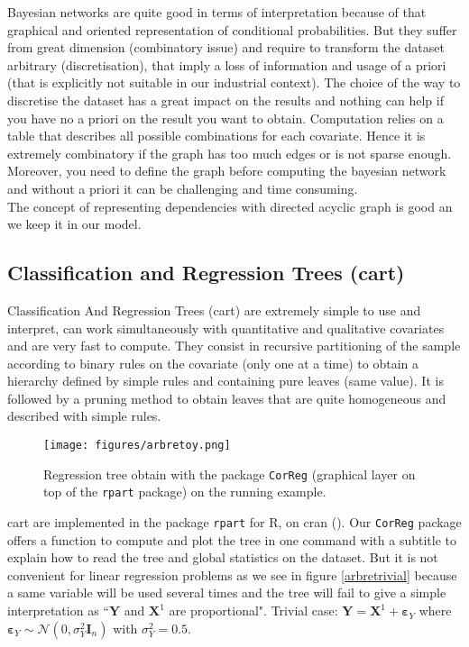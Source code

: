 \documentclass[12pt,a4paper]{report}
\begin{document}
		Bayesian networks are quite good in terms of interpretation because of that graphical and oriented representation of conditional probabilities. But they suffer from great dimension (combinatory issue) and require to transform the dataset arbitrary (discretisation), that imply a loss of information and usage of a priori (that is explicitly not suitable in our industrial context). The choice of the way to discretise the dataset has a great impact on the results and nothing can help if you have no a priori on the result you want to obtain. Computation relies on a table that describes all possible combinations for each covariate. Hence it is extremely combinatory if the graph has too much edges or is not sparse enough. Moreover, you need to define the graph before computing the bayesian network and without a priori it can be challenging and time consuming.\\
		
The concept of representing dependencies with directed acyclic graph is good an we keep it in our model.		
			
	
		
	
\subsection{Classification and Regression Trees ({\sc cart})}

	
		Classification And Regression Trees ({\sc cart}) \cite{breiman1984classification} are extremely simple to use and interpret, can work simultaneously with quantitative and qualitative covariates and are very fast to compute. They consist in recursive partitioning of the sample according to binary rules on the covariate (only one at a time) to obtain a hierarchy defined by simple rules and containing pure leaves (same value). It is followed by a pruning method to obtain leaves that are quite homogeneous and described with simple rules.\\
		
		\begin{figure}
			\centering
				\texttt{[image: figures/arbretoy.png]} 
			\caption{Regression tree obtain with the package {\tt CorReg}
			 (graphical layer on top of  the {\tt rpart} package) on the running example.}\label{arbretoy}
		\end{figure}
		{\sc cart} are implemented in the package {\tt rpart} 
		for R, on {\sc cran} (\cite{packagerpart}). Our {\tt CorReg} 
		package offers a function to compute and plot the tree in one command with a subtitle to explain how to read the tree and global statistics on the dataset.
		But it is not convenient for linear regression problems as we see in figure \ref{arbretrivial} because a same variable will be used several times and the tree will fail to give a simple interpretation as ``$\boldsymbol{Y}$ and $\boldsymbol{X}^1$ are proportional". Trivial case: $\boldsymbol{Y}=\boldsymbol{X}^1 + \boldsymbol{\varepsilon}_Y$ where $\boldsymbol{\varepsilon}_Y \sim \mathcal{N}(0, \sigma^2_Y \boldsymbol{I}_n)$ with $\sigma_Y^2=0.5$. \\
		
\end{document}
